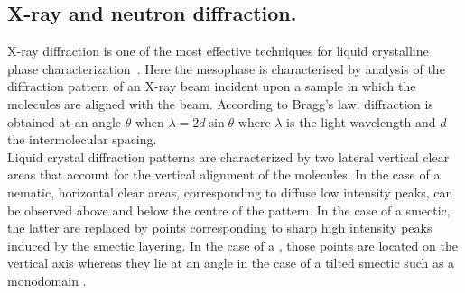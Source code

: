 \subsection{X-ray and neutron diffraction.}

X-ray diffraction is one of the most effective techniques for liquid crystalline phase
characterization~\cite{introSoftMatter, greenBook}. Here the mesophase is characterised by analysis of
the diffraction pattern of an X-ray beam incident upon a sample in which the molecules are
aligned with the beam. According to  Bragg's law, diffraction
is obtained at an angle $\theta$ when $\lambda = 2d\sin\theta$ where $\lambda$ is the light
wavelength and $d$ the intermolecular spacing.\\
%
Liquid crystal diffraction patterns are characterized by two lateral vertical clear areas that account 
for the vertical alignment of the molecules. In the case of a nematic, horizontal clear areas,
corresponding to diffuse low intensity peaks, can be observed above and below the centre of the
pattern. In the case of a smectic, the latter are replaced by points corresponding to sharp high
intensity peaks induced by the smectic layering. In the case of a \smA, those points
are located on the vertical axis whereas they lie at an angle in the case of a tilted
smectic such as a monodomain \smC.

